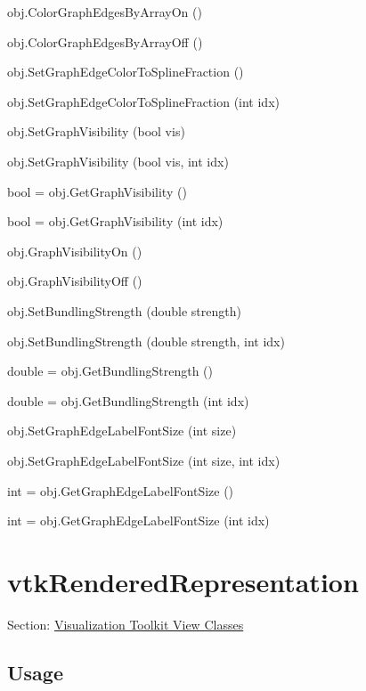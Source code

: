 \begin{DoxyItemize}
\item {\ttfamily obj.\-Color\-Graph\-Edges\-By\-Array\-On ()}  
\item {\ttfamily obj.\-Color\-Graph\-Edges\-By\-Array\-Off ()}  
\item {\ttfamily obj.\-Set\-Graph\-Edge\-Color\-To\-Spline\-Fraction ()}  
\item {\ttfamily obj.\-Set\-Graph\-Edge\-Color\-To\-Spline\-Fraction (int idx)}  
\item {\ttfamily obj.\-Set\-Graph\-Visibility (bool vis)}  
\item {\ttfamily obj.\-Set\-Graph\-Visibility (bool vis, int idx)}  
\item {\ttfamily bool = obj.\-Get\-Graph\-Visibility ()}  
\item {\ttfamily bool = obj.\-Get\-Graph\-Visibility (int idx)}  
\item {\ttfamily obj.\-Graph\-Visibility\-On ()}  
\item {\ttfamily obj.\-Graph\-Visibility\-Off ()}  
\item {\ttfamily obj.\-Set\-Bundling\-Strength (double strength)}  
\item {\ttfamily obj.\-Set\-Bundling\-Strength (double strength, int idx)}  
\item {\ttfamily double = obj.\-Get\-Bundling\-Strength ()}  
\item {\ttfamily double = obj.\-Get\-Bundling\-Strength (int idx)}  
\item {\ttfamily obj.\-Set\-Graph\-Edge\-Label\-Font\-Size (int size)}  
\item {\ttfamily obj.\-Set\-Graph\-Edge\-Label\-Font\-Size (int size, int idx)}  
\item {\ttfamily int = obj.\-Get\-Graph\-Edge\-Label\-Font\-Size ()}  
\item {\ttfamily int = obj.\-Get\-Graph\-Edge\-Label\-Font\-Size (int idx)}  
\end{DoxyItemize}\hypertarget{vtkviews_vtkrenderedrepresentation}{}\section{vtk\-Rendered\-Representation}\label{vtkviews_vtkrenderedrepresentation}
Section\-: \hyperlink{sec_vtkviews}{Visualization Toolkit View Classes} \hypertarget{vtkwidgets_vtkxyplotwidget_Usage}{}\subsection{Usage}\label{vtkwidgets_vtkxyplotwidget_Usage}
